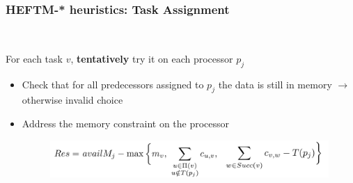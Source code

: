 \documentclass[xcolor=svgnames,titlepage,english,presentation]{beamer}
\begin{document}
\begin{frame}[t]
    \frametitle{HEFTM-* heuristics: Task Assignment}
    ~~~~~
    
 For each task $v$, \textbf{tentatively} try it on each processor $p_j$

  \begin{itemize}
      \item Check that for all predecessors assigned to $p_j$ the data is still in memory $\rightarrow$ otherwise invalid choice
      \item Address the memory constraint on the processor \\

       \begin{figure}
            \centering
            \includegraphics[width=.8\textwidth]{diagrams/images/Res-formula}
        \end{figure}
  \end{itemize}

    \begin{center}
    \end{center}


\end{frame}
\end{document}
